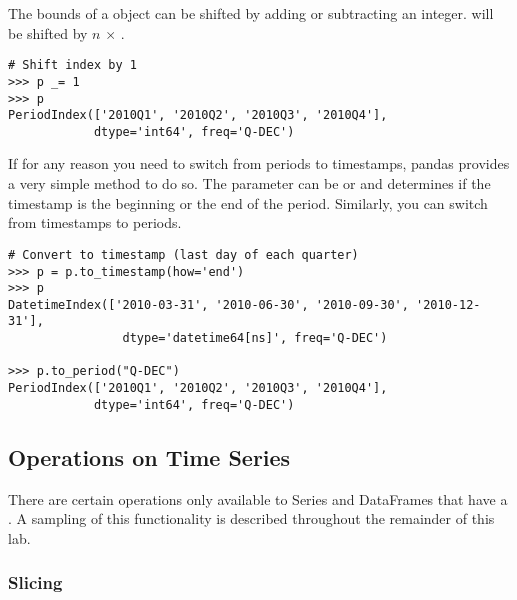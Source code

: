 The bounds of a  object can be shifted by adding or subtracting an integer.
  will be shifted by $n$ $\times$ .

\begin{lstlisting}
# Shift index by 1
>>> p _= 1
>>> p
PeriodIndex(['2010Q1', '2010Q2', '2010Q3', '2010Q4'],
            dtype='int64', freq='Q-DEC')
\end{lstlisting}

If for any reason you need to switch from periods to timestamps, pandas provides a very simple method to do so.
The  parameter can be  or  and determines if the timestamp is the beginning or the end of the period.
Similarly, you can switch from timestamps to periods.

\begin{lstlisting}
# Convert to timestamp (last day of each quarter)
>>> p = p.to_timestamp(how='end')
>>> p
DatetimeIndex(['2010-03-31', '2010-06-30', '2010-09-30', '2010-12-31'],
                dtype='datetime64[ns]', freq='Q-DEC')

>>> p.to_period("Q-DEC")
PeriodIndex(['2010Q1', '2010Q2', '2010Q3', '2010Q4'],
            dtype='int64', freq='Q-DEC')

\end{lstlisting}

\begin{comment}
\begin{problem} %
The file \texttt{finances.csv} contains a list of simulated quarterly earnings and expense totals from a fictional company.
Load the data into a \li{Series} or \li{DataFrame} with a \li{PeriodIndex} with a quarterly frequency.
Let \li{how=end}.
Assume the fiscal year starts at the beginning of September and that the data begins in September 1978.
Return the \li{DataFrame}.
\end{problem}
\end{comment}
\subsection*{Operations on Time Series}

There are certain operations only available to Series and DataFrames that have a . A sampling of this functionality is described throughout the remainder of this lab.

\subsubsection*{Slicing}

